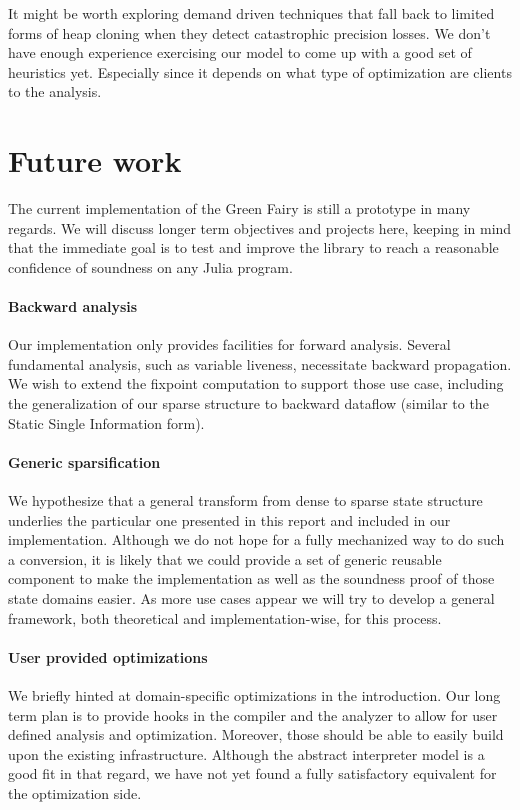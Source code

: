 \documentclass[11pt]{article}
\begin{document}
It might be worth exploring demand driven techniques that fall back to limited forms of heap cloning when they detect catastrophic precision losses.
We don't have enough experience exercising our model to come up with a good set of heuristics yet.
Especially since it depends on what type of optimization are clients to the analysis.

\clearpage

\section*{Future work}

The current implementation of the Green Fairy is still a prototype in many regards.
We will discuss longer term objectives and projects here, keeping in mind that the immediate goal is to test and improve the library to reach a reasonable confidence of soundness on any Julia program.

\paragraph{Backward analysis}
Our implementation only provides facilities for forward analysis.
Several fundamental analysis, such as variable liveness, necessitate backward propagation.
We wish to extend the fixpoint computation to support those use case, including the generalization of our sparse structure to backward dataflow (similar to the Static Single Information form).

\paragraph{Generic sparsification} We hypothesize that a general transform from dense to sparse state structure underlies the particular one presented in this report and included in our implementation.
Although we do not hope for a fully mechanized way to do such a conversion, it is likely that we could provide a set of generic reusable component to make the implementation as well as the soundness proof of those state domains easier.
As more use cases appear we will try to develop a general framework, both theoretical and implementation-wise, for this process.

\paragraph{User provided optimizations} We briefly hinted at domain-specific optimizations in the introduction.
Our long term plan is to provide hooks in the compiler and the analyzer to allow for user defined analysis and optimization.
Moreover, those should be able to easily build upon the existing infrastructure.
Although the abstract interpreter model is a good fit in that regard, we have not yet found a fully satisfactory equivalent for the optimization side.
\end{document}
